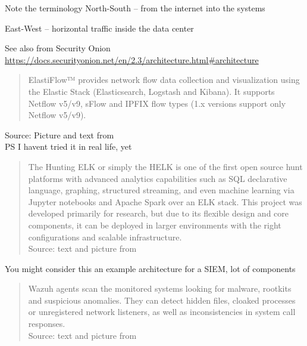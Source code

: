 \documentclass[Screen16to9,17pt]{foils}
\begin{document}
\begin{list2}
\item Note the terminology North-South -- from the internet into the systems
\item East-West -- horizontal traffic inside the data center
\item See also from Security Onion \url{https://docs.securityonion.net/en/2.3/architecture.html#architecture}
\end{list2}





\begin{quote}
  ElastiFlow™ provides network flow data collection and visualization using the Elastic Stack (Elasticsearch, Logstash and Kibana). It supports Netflow v5/v9, sFlow and IPFIX flow types (1.x versions support only Netflow v5/v9).
\end{quote}
Source: Picture and text from  \\
PS I havent tried it in real life, yet



\begin{quote}\small
The Hunting ELK or simply the HELK is one of the first open source hunt platforms with advanced analytics capabilities such as SQL declarative language, graphing, structured streaming, and even machine learning via Jupyter notebooks and Apache Spark over an ELK stack. This project was developed primarily for research, but due to its flexible design and core components, it can be deployed in larger environments with the right configurations and scalable infrastructure.\\
Source: text and picture from 
\end{quote}

\begin{list2}
\item You might consider this an example architecture for a SIEM, lot of components
\end{list2}




\begin{quote}\small
Wazuh agents scan the monitored systems looking for malware, rootkits and suspicious anomalies. They can detect hidden files, cloaked processes or unregistered network listeners, as well as inconsistencies in system call responses.\\
Source: text and picture from 
\end{quote}
\end{document}
